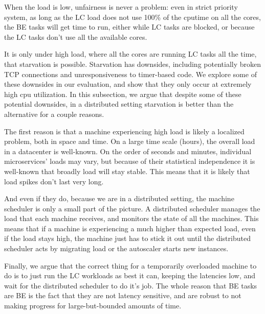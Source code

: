 When the load is low, unfairness is never a problem: even in strict priority
system, as long as the LC load does not use 100\% of the cputime on all the
cores, the BE tasks will get time to run, either while LC tasks are blocked, or
because the LC tasks don't use all the available cores.

It is only under high load, where all the cores are running LC tasks all the
time, that starvation is possible. Starvation has downsides, including
potentially broken TCP connections and unresponsiveness to timer-based code. We
explore some of these downsides in our evaluation, and show that they only occur
at extremely high cpu utilization. In this subsection, we argue that despite
some of these potential downsides, in a distributed setting starvation is better
than the alternative for a couple reasons.

The first reason is that a machine experiencing high load is likely a localized
problem, both in space and time. On a large time scale (hours), the overall load
in a datacenter is well-known. On the order of seconds and minutes, individual
microservices' loads may vary, but because of their statistical independence it
is well-known that broadly load will stay stable. This means that it is likely
that load spikes don't last very long.

And even if they do, because we are in a distributed setting, the machine
scheduler is only a small part of the picture. A distributed scheduler manages
the load that each machine receives, and monitors the state of all the machines.
This means that if a machine is experiencing a much higher than expected load,
even if the load stays high, the machine just has to stick it out until the
distributed scheduler acts by migrating load or the autoscaler starts new
instances.

Finally, we argue that the correct thing for a temporarily overloaded machine to
do is to just run the LC workloads as best it can, keeping the latencies low,
and wait for the distributed scheduler to do it's job. The whole reason that BE
tasks are BE is the fact that they are not latency sensitive, and are robust to
not making progress for large-but-bounded amounts of time.